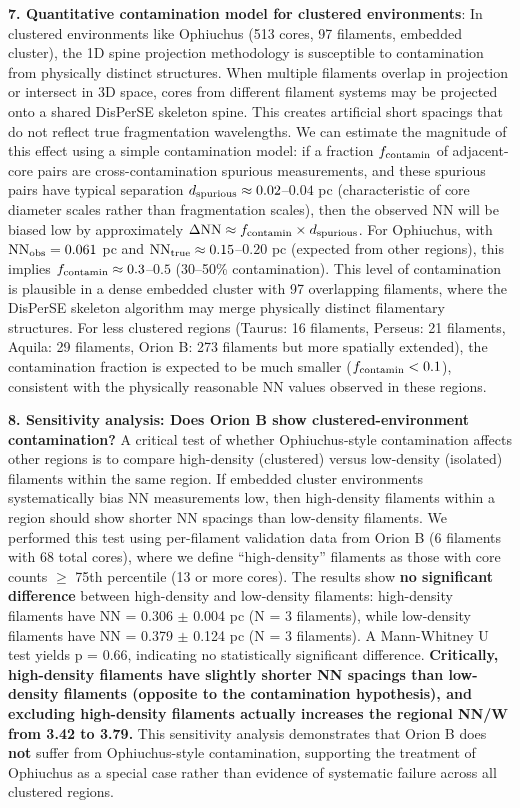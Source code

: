 \documentclass[twoside,twocolumn]{mnras}
\begin{document}
\textbf{7. Quantitative contamination model for clustered environments}: In clustered environments like Ophiuchus (513 cores, 97 filaments, embedded cluster), the 1D spine projection methodology is susceptible to contamination from physically distinct structures. When multiple filaments overlap in projection or intersect in 3D space, cores from different filament systems may be projected onto a shared DisPerSE skeleton spine. This creates artificial short spacings that do not reflect true fragmentation wavelengths. We can estimate the magnitude of this effect using a simple contamination model: if a fraction $f_{\rm contamin}$ of adjacent-core pairs are cross-contamination spurious measurements, and these spurious pairs have typical separation $d_{\rm spurious} \approx 0.02$--$0.04$ pc (characteristic of core diameter scales rather than fragmentation scales), then the observed NN will be biased low by approximately $\Delta{\rm NN} \approx f_{\rm contamin} \times d_{\rm spurious}$. For Ophiuchus, with ${\rm NN}_{\rm obs} = 0.061$ pc and ${\rm NN}_{\rm true} \approx 0.15$--$0.20$ pc (expected from other regions), this implies $f_{\rm contamin} \approx 0.3$--$0.5$ (30--50\% contamination). This level of contamination is plausible in a dense embedded cluster with 97 overlapping filaments, where the DisPerSE skeleton algorithm may merge physically distinct filamentary structures. For less clustered regions (Taurus: 16 filaments, Perseus: 21 filaments, Aquila: 29 filaments, Orion B: 273 filaments but more spatially extended), the contamination fraction is expected to be much smaller ($f_{\rm contamin} < 0.1$), consistent with the physically reasonable NN values observed in these regions.

\textbf{8. Sensitivity analysis: Does Orion B show clustered-environment contamination?} A critical test of whether Ophiuchus-style contamination affects other regions is to compare high-density (clustered) versus low-density (isolated) filaments within the same region. If embedded cluster environments systematically bias NN measurements low, then high-density filaments within a region should show shorter NN spacings than low-density filaments. We performed this test using per-filament validation data from Orion B (6 filaments with 68 total cores), where we define ``high-density'' filaments as those with core counts $\ge$ 75th percentile (13 or more cores). The results show \textbf{no significant difference} between high-density and low-density filaments: high-density filaments have NN = 0.306 $\pm$ 0.004 pc (N = 3 filaments), while low-density filaments have NN = 0.379 $\pm$ 0.124 pc (N = 3 filaments). A Mann-Whitney U test yields p = 0.66, indicating no statistically significant difference. \textbf{Critically, high-density filaments have slightly shorter NN spacings than low-density filaments (opposite to the contamination hypothesis), and excluding high-density filaments actually increases the regional NN/W from 3.42 to 3.79.} This sensitivity analysis demonstrates that Orion B does \textbf{not} suffer from Ophiuchus-style contamination, supporting the treatment of Ophiuchus as a special case rather than evidence of systematic failure across all clustered regions.
\end{document}
